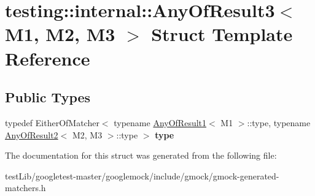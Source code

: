 \hypertarget{structtesting_1_1internal_1_1AnyOfResult3}{}\section{testing\+:\+:internal\+:\+:Any\+Of\+Result3$<$ M1, M2, M3 $>$ Struct Template Reference}
\label{structtesting_1_1internal_1_1AnyOfResult3}
\subsection*{Public Types}
\begin{DoxyCompactItemize}
\item 
\mbox{\label{structtesting_1_1internal_1_1AnyOfResult3_a232b20553cc0a33a6741e85e19ef4b0c}} 
typedef Either\+Of\+Matcher$<$ typename \hyperlink{structtesting_1_1internal_1_1AnyOfResult1}{Any\+Of\+Result1}$<$ M1 $>$\+::type, typename \hyperlink{structtesting_1_1internal_1_1AnyOfResult2}{Any\+Of\+Result2}$<$ M2, M3 $>$\+::type $>$ {\bfseries type}
\end{DoxyCompactItemize}


The documentation for this struct was generated from the following file\+:\begin{DoxyCompactItemize}
\item 
test\+Lib/googletest-\/master/googlemock/include/gmock/gmock-\/generated-\/matchers.\+h\end{DoxyCompactItemize}
